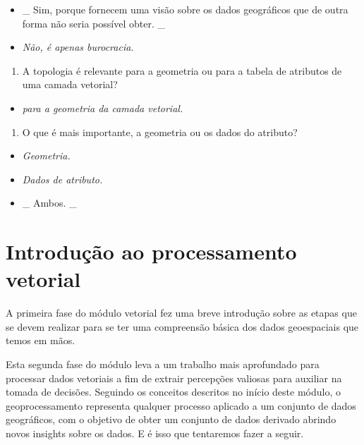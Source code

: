 \documentclass[
  portuguese,
]{krantz}
\providecommand{\tightlist}{%
  \setlength{\itemsep}{0pt}\setlength{\parskip}{0pt}}
\begin{document}
\begin{itemize}
\tightlist
\item
  \_ { Sim, porque fornecem uma visão sobre os dados geográficos que de outra forma não seria possível obter. } \_
\item
  \emph{Não, é apenas burocracia. }
\end{itemize}

\begin{enumerate}
\def\labelenumi{\arabic{enumi}.}
\setcounter{enumi}{1}
\tightlist
\item
  A topologia é relevante para a geometria ou para a tabela de atributos de uma camada vetorial?
\end{enumerate}

\begin{itemize}
\tightlist
\item
  \emph{para a geometria da camada vetorial. }
\end{itemize}

\begin{enumerate}
\def\labelenumi{\arabic{enumi}.}
\setcounter{enumi}{2}
\tightlist
\item
  O que é mais importante, a geometria ou os dados do atributo?
\end{enumerate}

\begin{itemize}
\tightlist
\item
  \emph{Geometria.}
\item
  \emph{Dados de atributo.}
\item
  \_ { Ambos. } \_
\end{itemize}

\hypertarget{introduuxe7uxe3o-ao-processamento-vetorial}{%
\section{Introdução ao processamento vetorial}\label{introduuxe7uxe3o-ao-processamento-vetorial}}

A primeira fase do módulo vetorial fez uma breve introdução sobre as etapas que se devem realizar para se ter uma compreensão básica dos dados geoespaciais que temos em mãos.

Esta segunda fase do módulo leva a um trabalho mais aprofundado para processar dados vetoriais a fim de extrair percepções valiosas para auxiliar na tomada de decisões. Seguindo os conceitos descritos no início deste módulo, o geoprocessamento representa qualquer processo aplicado a um conjunto de dados geográficos, com o objetivo de obter um conjunto de dados derivado abrindo novos insights sobre os dados. E é isso que tentaremos fazer a seguir.
\end{document}
